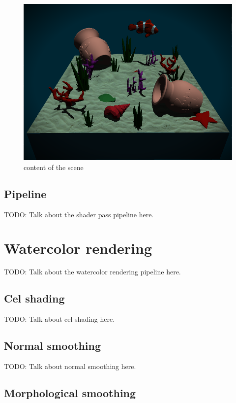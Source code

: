 \documentclass{article}
\begin{document}
\begin{figure}[h]
 \includegraphics[width=\columnwidth]{imgs/scene_contents.png}
 \caption{content of the scene}
 \label{fig:scene_content}
\end{figure}

\subsection{Pipeline}

TODO: Talk about the shader pass pipeline here.

\newpage
\section{Watercolor rendering}

TODO: Talk about the watercolor rendering pipeline here.

\subsection{Cel shading}

TODO: Talk about cel shading here.

\subsection{Normal smoothing}

TODO: Talk about normal smoothing here.

\subsection{Morphological smoothing}
\end{document}
